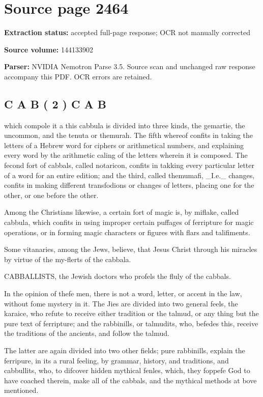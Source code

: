 \clearpage
\section{Source page 2464}
\textbf{Extraction status:} accepted full-page response; OCR not manually corrected\par
\textbf{Source volume:} 144133902\par
\textbf{Parser:} NVIDIA Nemotron Parse 3.5. Source scan and unchanged raw response accompany this PDF. OCR errors are retained.\par\medskip
\subsection*{C A B ( 2 ) C A B}
which compole it a this cabbula is divided into three kinds, the gemartie, the uncommon, and the tenuta or themurah. The fifth whereof confits in taking the letters of a Hebrew word for ciphers or arithmetical numbers, and explaining every word by the arithmetic caling of the letters wherein it is composed. The fecond fort of cabbals, called notaricon, confits in takking every particular letter of a word for an entire edition; and the third, called themumafi, \_I.e.\_ changes, confits in making different transfodions or changes of letters, placing one for the other, or one before the other.\par\medskip
Among the Christians likewise, a certain fort of magic is, by miflake, called cabbula, which confits in using improper certain puffages of ferripture for magic operations, or in forming magic characters or figures with flars and talifiments.\par\medskip
Some vitanaries, among the Jews, believe, that Jesus Christ through his miracles by virtue of the my-flerts of the cabbala.\par\medskip
CABBALLISTS, the Jewish doctors who profels the fluly of the cabbals.\par\medskip
In the opinion of thefe men, there is not a word, letter, or accent in the law, without fome mystery in it. The Jies are divided into two general feels, the karaice, who refute to receive either tradition or the talmud, or any thing but the pure text of ferripture; and the rabbinills, or talmudits, who, befedes this, receive the traditions of the ancients, and follow the talmud.\par\medskip
The latter are again divided into two other fields; pure rabbinills, explain the ferripure, in its a rural feeling, by grammar, history, and traditions, and cabbullits, who, to difcover hidden mythical fenles, which, they foppefe God to have coached therein, make all of the cabbals, and the mythical methods at bove mentioned.\par\medskip
